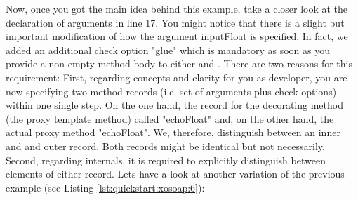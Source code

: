 Now, once you got the main idea behind this example, take a closer look  at the declaration of 
arguments in line 17. You might notice that there is a slight but important modification of how the 
argument inputFloat is specified. In fact, we added an additional \href{http://media.wu-wien.ac.at/doc/tutorial.html#non-pos-args}{check option} "glue" which is 
mandatory as soon as you provide a non-empty method body to either  and . There 
are two reasons for this requirement: First, regarding concepts and clarity for you as developer, you are 
now specifying two method records (i.e. set of arguments plus check options)  within one single step. On 
the one hand, the record for the decorating method (the proxy template method) called "echoFloat" and, 
on the other hand, the actual proxy method "echoFloat". We, therefore, distinguish between an inner and 
and outer record. Both records might be identical but not necessarily. Second, regarding internals, it is 
required to explicitly distinguish between elements of either record. Lets have a look at another variation 
of the previous example (see Listing \ref{lst:quickstart:xosoap:6}):



